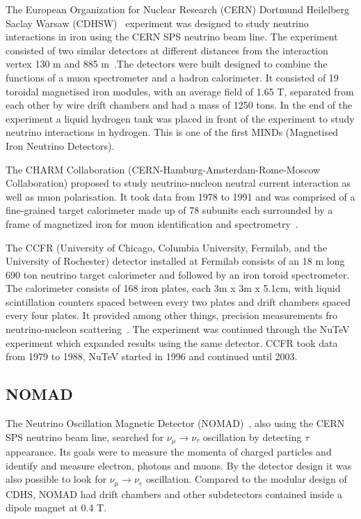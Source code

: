 The European Organization for Nuclear Research (CERN) Dortmund Heilelberg Saclay Warsaw (CDHSW)~\cite{40CDHSW} experiment was designed to study neutrino interactions in iron using the CERN SPS neutrino beam line. The experiment consisted of two similar detectors at different distances from the interaction vertex 130 m and 885 m~\cite{40CDHSW}.The detectors were built designed to combine the functions of a muon spectrometer and a hadron calorimeter. It consisted of 19 toroidal magnetised iron modules, with an average field of 1.65 T, separated from each other by wire drift chambers and had a mass of 1250 tons. In the end of the experiment a liquid hydrogen tank was placed in front of the experiment to study neutrino interactions in hydrogen. This is one of the first MINDs (Magnetised Iron Neutrino Detectors).

The CHARM Collaboration (CERN-Hamburg-Amsterdam-Rome-Moscow Collaboration) proposed to study neutrino-nucleon neutral current interaction as well as muon polarisation. It took data from 1978 to 1991 and  was comprised of a fine-grained target calorimeter made up of 78 subunits each surrounded by a frame of magnetized iron for muon identification and spectrometry~\cite{68CHARM}.

The CCFR (University of Chicago, Columbia University, Fermilab, and the University of Rochester) detector installed at Fermilab consists of an 18 m long 690 ton neutrino target calorimeter and followed by an iron toroid spectrometer. The calorimeter consists of 168 iron plates, each 3m x 3m x 5.1cm, with liquid scintillation counters spaced between every two plates and drift chambers spaced every four plates. It provided among other things, precision measurements fro neutrino-nucleon scattering~\cite{67CCFR}. The experiment was continued through the NuTeV experiment which expanded results using the same detector. CCFR took data from 1979 to 1988, NuTeV started in 1996 and continued until 2003.

\subsection{NOMAD}
The Neutrino Oscillation Magnetic Detector (NOMAD)~\cite{NOMADexp}, also using the CERN SPS neutrino beam line, searched for $\nu_\mu \rightarrow \nu_\tau$ oscillation by detecting $\tau$ appearance. Its goals were to measure the momenta of charged particles and identify and measure electron, photons and muons. By the detector design it was also possible to look for $\nu_\mu \rightarrow \nu_e$ oscillation. Compared to the modular design of CDHS, NOMAD had drift chambers and other subdetectors contained inside a dipole magnet at 0.4 T.

